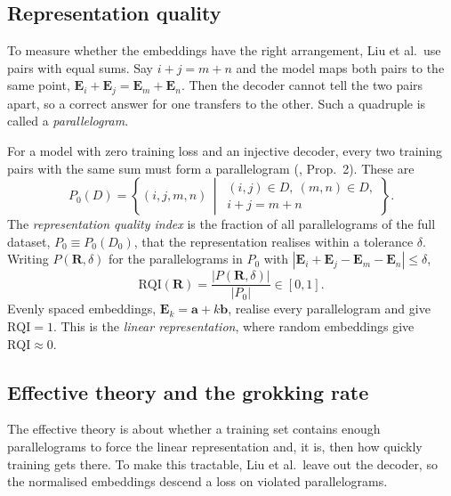 \subsection{Representation quality}
\label{sec:rqi}

To measure whether the embeddings have the right arrangement, Liu et al.\ use
pairs with equal sums. Say $i + j = m + n$ and the model maps both pairs to the
same point, $\mathbf{E}_i + \mathbf{E}_j = \mathbf{E}_m + \mathbf{E}_n$. Then
the decoder cannot tell the two pairs apart, so a correct answer for one
transfers to the other. Such a quadruple is called a \emph{parallelogram}.

For a model with zero training loss and an injective decoder, every two
training pairs with the same sum must form a parallelogram
(\cite{liu2022grokking}, Prop.~2). These are
%
\begin{equation}
  P_0(D) = \left\{ (i,j,m,n) \,\middle|\,
    \begin{array}{l}
      (i,j) \in D,\ (m,n) \in D, \\[-1pt]
      i+j = m+n
    \end{array} \right\}.
  \label{eq:permissible}
\end{equation}
%
The \emph{representation quality index} is the fraction of all parallelograms
of the full dataset, $P_0 \equiv P_0(D_0)$, that the representation realises
within a tolerance $\delta$. Writing $P(\mathbf{R}, \delta)$ for the
parallelograms in $P_0$ with
$|\mathbf{E}_i + \mathbf{E}_j - \mathbf{E}_m - \mathbf{E}_n| \le \delta$,
%
\begin{equation}
  \mathrm{RQI}(\mathbf{R}) = \frac{|P(\mathbf{R}, \delta)|}{|P_0|} \in [0, 1].
  \label{eq:rqi}
\end{equation}
%
Evenly spaced embeddings, $\mathbf{E}_k = \mathbf{a} + k\mathbf{b}$, realise
every parallelogram and give $\mathrm{RQI} = 1$. This is the \emph{linear representation}, where random embeddings give $\mathrm{RQI} \approx 0$.

\subsection{Effective theory and the grokking rate}
\label{sec:efftheory}

The effective theory is about whether a training set contains enough
parallelograms to force the linear representation and, it is, then how quickly
training gets there. To make this tractable, Liu et al.\ leave out the decoder, so
the normalised embeddings descend a loss on violated parallelograms.

